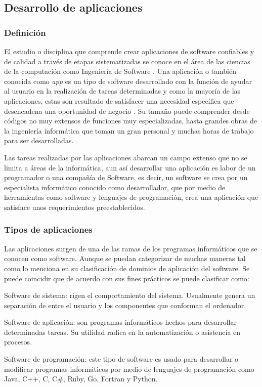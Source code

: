 \subsection{Desarrollo de aplicaciones}
\subsubsection{Definición}
El estudio o disciplina que comprende crear aplicaciones de software confiables y de calidad a través de etapas sistematizadas se conoce en el área de las ciencias de la computación como Ingeniería de Software \parencite{Sommerville2005}. Una aplicación o también conocida como \textit{app} es un tipo de software desarrollado con la función de ayudar al usuario en la realización de tareas determinadas y como la mayoría de las aplicaciones, estas son resultado de satisfacer una necesidad específica que desencadena una oportunidad de negocio \parencite{Pressman2002}. Su tamaño puede comprender desde códigos no muy extensos de funciones muy especializadas, hasta grandes obras de la ingeniería informática que toman un gran personal y muchas horas de trabajo para ser desarrolladas.

Las tareas realizadas por las aplicaciones abarcan un campo extenso que no se limita a áreas de la informática, aun así desarrollar una aplicación es labor de un programador o una compañía de Software, es decir, un software se crea por un especialista informático conocido como desarrollador, que por medio de herramientas como software y lenguajes de programación, crea una aplicación que satisface unos requerimientos preestablecidos. 

\subsubsection{Tipos de aplicaciones}
Las aplicaciones surgen de una de las ramas de los programas informáticos que se conocen como software. Aunque se puedan categorizar de muchas maneras tal como lo menciona \parencite{Pressman2002} en su clasificación de dominios de aplicación del software. Se puede coincidir que de acuerdo con sus fines prácticos se puede clasificar como: 

\begin{APAitemize}
    \item Software de sistema: rigen el comportamiento del sistema. Usualmente genera un separación de entre el usuario y los componentes que conforman el ordenador. 
    \item Software de aplicación: son programas informáticos hechos para desarrollar determinadas tareas. Su utilidad radica en la automatización o asistencia en procesos.
    \item Software de programación: este tipo de software es usado para desarrollar o modificar programas informáticos por medio de lenguajes de programación como Java, C++, C, C\#, Ruby, Go, Fortran y Python.
\end{APAitemize}

